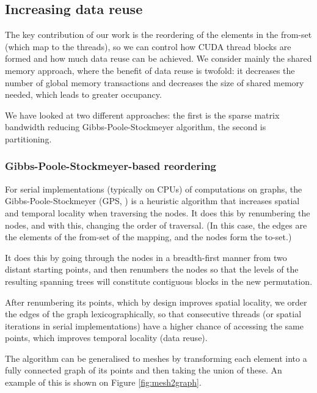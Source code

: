\subsection{Increasing data reuse}\label{increasing-data-reuse}
The key contribution of our work is the reordering of the elements in the
from-set (which map to the threads), so we can control how CUDA thread blocks
are formed and how much data reuse can be achieved. We consider mainly the
shared memory approach, where the benefit of data reuse is twofold: it decreases
the number of global memory transactions and decreases the size of shared memory
needed, which leads to greater occupancy.

We have looked at two different approaches: the first is the sparse matrix
bandwidth reducing Gibbs-Poole-Stockmeyer algorithm, the second is partitioning.

\subsubsection{Gibbs-Poole-Stockmeyer-based reordering}

For serial implementations (typically on CPUs) of computations on graphs, the
Gibbs-Poole-Stockmeyer (GPS, \cite{gps}) is a heuristic algorithm that increases
spatial and temporal locality when traversing the nodes. It does this by
renumbering the nodes, and with this, changing the order of traversal. (In this
case, the edges are the elements of the from-set of the mapping, and the nodes
form the to-set.)

It does this by going through the nodes in a breadth-first manner from two
distant starting points, and then renumbers the nodes so that the levels of the
resulting spanning trees will constitute contiguous blocks in the new
permutation.

After renumbering its points, which by design improves spatial locality, we
order the edges of the graph lexicographically, so that consecutive threads (or
spatial iterations in serial implementations) have a higher chance of accessing
the same points, which improves temporal locality (data reuse).

The algorithm can be generalised to meshes by transforming each element into a
fully connected graph of its points and then taking the union of these. An
example of this is shown on Figure \ref{fig:mesh2graph}.

